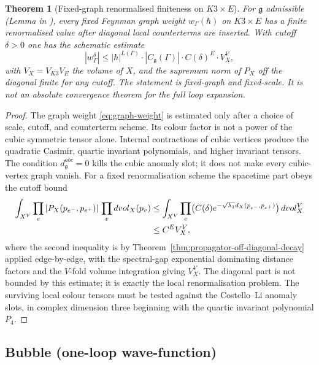 \documentclass[11pt]{article}
\providecommand{\frakg}{\mathfrak{g}}
\newtheorem{theorem}{Theorem}
\theoremstyle{definition}\newtheorem{definition}[theorem]{Definition}
\theoremstyle{remark}\newtheorem{remark}[theorem]{Remark}\newtheorem{example}[theorem]{Example}
\begin{document}
\begin{theorem}[Fixed-graph renormalised finiteness on $K3\times E$]
\label{thm:per-loop-convergence-k3xe}
For $\frakg$ admissible (Lemma in
\cite[\S\ref{sec:per-loop-bounds}]{cy_to_chiral}), every fixed Feynman
graph weight $w_\Gamma(\hbar)$ on $K3\times E$ has a finite
renormalised value after diagonal local counterterms are inserted.
With cutoff $\delta>0$ one has the schematic estimate
\begin{equation}
\label{eq:per-loop-bound}
|w_\Gamma^\delta| \leq |\hbar|^{L(\Gamma)}\cdot
|C_\frakg(\Gamma)|\cdot C(\delta)^E\cdot V_X^V,
\end{equation}
with $V_X = V_{K3}V_E$ the volume of $X$, and the supremum norm of
$P_X$ off the diagonal finite for any cutoff. The statement is
fixed-graph and fixed-scale. It is not an absolute convergence theorem
for the full loop expansion.
\end{theorem}

\begin{proof}
The graph weight \eqref{eq:graph-weight} is estimated only after a
choice of scale, cutoff, and counterterm scheme. Its colour factor is
not a power of the cubic symmetric tensor alone. Internal contractions
of cubic vertices produce the quadratic Casimir, quartic invariant
polynomials, and higher invariant tensors. The condition
$d^{abc}_\frakg=0$ kills the cubic anomaly slot; it does not make every
cubic-vertex graph vanish. For a fixed renormalisation scheme the
spacetime part obeys the cutoff bound
\begin{align}
\int_{X^V}\prod_e |P_X(p_{e^-},p_{e^+})|\,\prod_v d\mathrm{vol}_X(p_v)
&\leq \int_{X^V}\prod_e \bigl(C(\delta)e^{-\sqrt{\lambda_1}d_X(p_{e^-},p_{e^+})}\bigr)\,d\mathrm{vol}_X^V\notag\\
&\leq C^E V_X^V,\label{eq:spacetime-bound}
\end{align}
where the second inequality is by Theorem~\ref{thm:propagator-off-diagonal-decay}
applied edge-by-edge, with the spectral-gap exponential dominating
distance factors and the $V$-fold volume integration giving $V_X^V$.
The diagonal part is not bounded by this estimate; it is exactly the
local renormalisation problem. The surviving local colour tensors must
be tested against the Costello--Li anomaly slots, in complex dimension
three beginning with the quartic invariant polynomial $P_4$.
\end{proof}

\subsection{Bubble (one-loop wave-function)}
\end{document}
